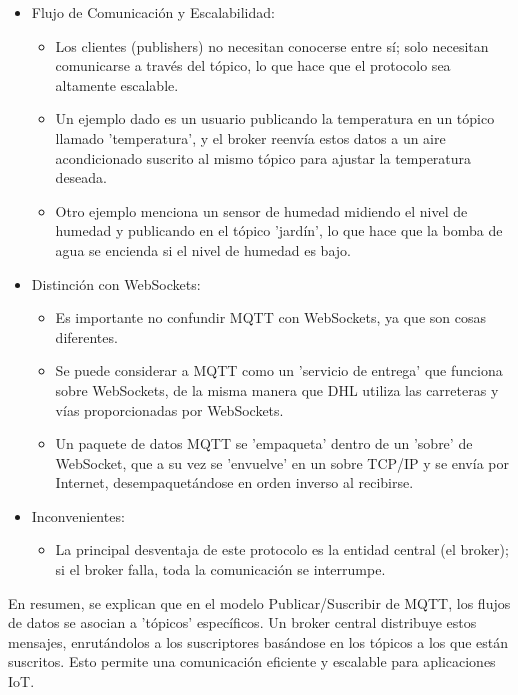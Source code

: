 \documentclass{report}
\begin{document}
\begin{itemize}
    \item Flujo de Comunicación y Escalabilidad:
        \begin{itemize}
            \item Los clientes (publishers) no necesitan conocerse entre sí; solo necesitan comunicarse a través del tópico, lo que 
            hace que el protocolo sea altamente escalable.
            \item Un ejemplo dado es un usuario publicando la temperatura en un tópico llamado 'temperatura', y el broker reenvía estos 
            datos a un aire acondicionado suscrito al mismo tópico para ajustar la temperatura deseada.
            \item Otro ejemplo menciona un sensor de humedad midiendo el nivel de humedad y publicando en el tópico 'jardín', lo 
            que hace que la bomba de agua se encienda si el nivel de humedad es bajo.        
        \end{itemize}

    \item Distinción con WebSockets:
        \begin{itemize}
            \item Es importante no confundir MQTT con WebSockets, ya que son cosas diferentes.
            \item Se puede considerar a MQTT como un 'servicio de entrega' que funciona sobre WebSockets, de la misma manera que DHL 
            utiliza las carreteras y vías proporcionadas por WebSockets.
            \item Un paquete de datos MQTT se 'empaqueta' dentro de un 'sobre' de WebSocket, que a su vez se 'envuelve' en un sobre 
            TCP/IP y se envía por Internet, desempaquetándose en orden inverso al recibirse.
        \end{itemize}

    \item Inconvenientes:
        \begin{itemize}
            \item La principal desventaja de este protocolo es la entidad central (el broker); si el broker falla, toda la comunicación se interrumpe.        
        \end{itemize}
\end{itemize}
En resumen, se  explican que en el modelo Publicar/Suscribir de MQTT, los flujos de datos se asocian a 'tópicos' específicos. 
Un broker central distribuye estos mensajes, enrutándolos a los suscriptores basándose en los tópicos a los que están suscritos. 
Esto permite una comunicación eficiente y escalable para aplicaciones IoT.
\end{document}
